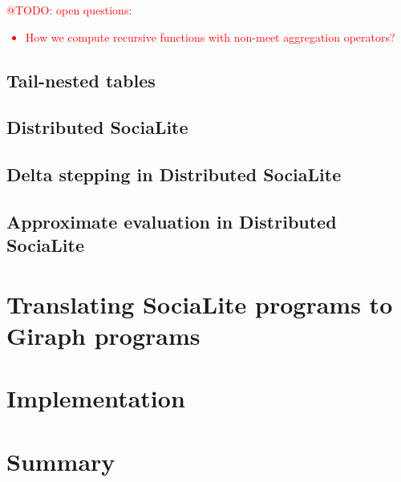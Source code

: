 \documentclass{pracamgr}
\makeatletter
\theoremstyle{plain}
\theoremstyle{definition}
\theoremstyle{remark}
\newcommand{\todo}[1]{\textcolor{red}{@TODO: #1}}
\makeatother
\begin{document}
\todo{open questions:
\begin{itemize}
\item How we compute recursive functions with non-meet aggregation operators?
\end{itemize}
}

\section{Tail-nested tables}\label{s:tnt}

\section{Distributed SociaLite}\label{s:distributed}

\section{Delta stepping in Distributed SociaLite}\label{s:deltastep}

\section{Approximate evaluation in Distributed SociaLite}\label{s:approxdist}

\chapter{Translating SociaLite programs to Giraph programs}\label{r:s2g}

\chapter{Implementation}\label{r:implementation}

\chapter{Summary}\label{r:summary}
\end{document}

